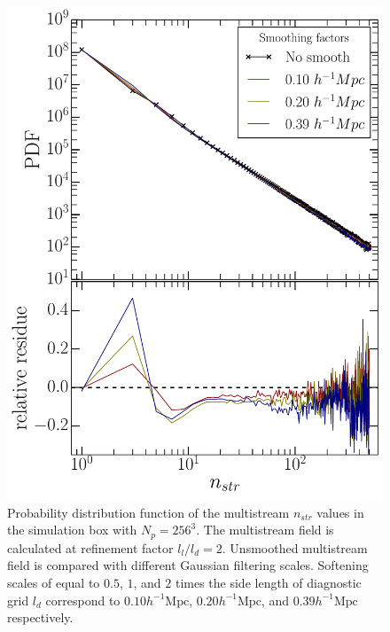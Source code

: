 \documentclass[fleqn,usenatbib,useAMS]{mnras}
\begin{document}
\begin{figure}
\begin{minipage}[t]{.99\linewidth}
  \centering\includegraphics[width=8.cm]{fig10.pdf} 

\end{minipage}\hfill
\caption{Probability distribution function of the multistream $n_{str}$ values in the simulation box with $N_p = 256^3$. The multistream field is calculated at refinement factor $l_l/l_d= 2$. Unsmoothed multistream field is compared with different Gaussian filtering scales. Softening scales of equal to $0.5$, $1$, and $2$ times the side length of diagnostic grid $l_d$ correspond to $0.10 h^{-1} \text{Mpc}$, $0.20 h^{-1} \text{Mpc}$, and $0.39 h^{-1} \text{Mpc}$ respectively.}
\label{fig:nstrSmooth}
\end{figure}
\end{document}
